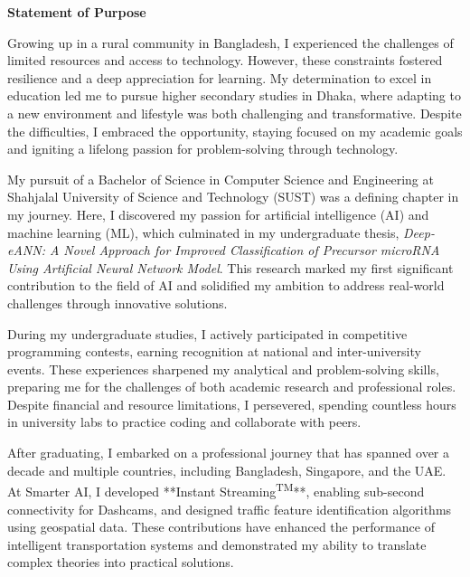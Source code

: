 \documentclass[11pt]{article}
\newif\ifshowSectionTitles
\begin{document}
\begin{center}
    {\Large \textbf{Statement of Purpose}}
\end{center}

\ifshowSectionTitles
\section*{Introduction}
\fi
Growing up in a rural community in Bangladesh, I experienced the challenges of limited resources and access to technology.
However, these constraints fostered resilience and a deep appreciation for learning.
My determination to excel in education led me to pursue higher secondary studies in Dhaka, where adapting to a new environment and lifestyle was both challenging and transformative.
Despite the difficulties, I embraced the opportunity, staying focused on my academic goals and igniting a lifelong passion for problem-solving through technology.

\ifshowSectionTitles
\section*{Academic Journey}
\fi
My pursuit of a Bachelor of Science in Computer Science and Engineering at Shahjalal University of Science and Technology (SUST) was a defining chapter in my journey.
Here, I discovered my passion for artificial intelligence (AI) and machine learning (ML), which culminated in my undergraduate thesis, \textit{Deep-eANN: A Novel Approach for Improved Classification of Precursor microRNA Using Artificial Neural Network Model}.
This research marked my first significant contribution to the field of AI and solidified my ambition to address real-world challenges through innovative solutions.

During my undergraduate studies, I actively participated in competitive programming contests, earning recognition at national and inter-university events.
These experiences sharpened my analytical and problem-solving skills, preparing me for the challenges of both academic research and professional roles.
Despite financial and resource limitations, I persevered, spending countless hours in university labs to practice coding and collaborate with peers.

\ifshowSectionTitles
\section*{Professional Experience}
\fi
After graduating, I embarked on a professional journey that has spanned over a decade and multiple countries, including Bangladesh, Singapore, and the UAE.
At Smarter AI, I developed **Instant Streaming\textsuperscript{TM}**, enabling sub-second connectivity for Dashcams, and designed traffic feature identification algorithms using geospatial data.
These contributions have enhanced the performance of intelligent transportation systems and demonstrated my ability to translate complex theories into practical solutions.
\end{document}
